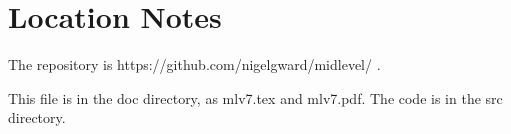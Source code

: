 \documentclass[11pt]{article}
\begin{document}
\section{Location Notes}

The repository is https://github.com/nigelgward/midlevel/ .

This file is in the doc directory, as mlv7.tex and mlv7.pdf.  The code
is in the src directory. 





\end{document}
